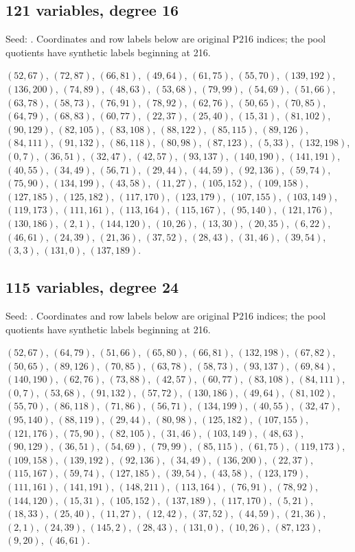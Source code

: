 \subsection*{121 variables, degree 16}
Seed: . Coordinates and row labels below are original P216 indices; the pool quotients have synthetic labels beginning at 216.
{\small\raggedright
$(52,67)$, $(72,87)$, $(66,81)$, $(49,64)$, $(61,75)$, $(55,70)$, $(139,192)$, $(136,200)$, $(74,89)$, $(48,63)$, $(53,68)$, $(79,99)$, $(54,69)$, $(51,66)$, $(63,78)$, $(58,73)$, $(76,91)$, $(78,92)$, $(62,76)$, $(50,65)$, $(70,85)$, $(64,79)$, $(68,83)$, $(60,77)$, $(22,37)$, $(25,40)$, $(15,31)$, $(81,102)$, $(90,129)$, $(82,105)$, $(83,108)$, $(88,122)$, $(85,115)$, $(89,126)$, $(84,111)$, $(91,132)$, $(86,118)$, $(80,98)$, $(87,123)$, $(5,33)$, $(132,198)$, $(0,7)$, $(36,51)$, $(32,47)$, $(42,57)$, $(93,137)$, $(140,190)$, $(141,191)$, $(40,55)$, $(34,49)$, $(56,71)$, $(29,44)$, $(44,59)$, $(92,136)$, $(59,74)$, $(75,90)$, $(134,199)$, $(43,58)$, $(11,27)$, $(105,152)$, $(109,158)$, $(127,185)$, $(125,182)$, $(117,170)$, $(123,179)$, $(107,155)$, $(103,149)$, $(119,173)$, $(111,161)$, $(113,164)$, $(115,167)$, $(95,140)$, $(121,176)$, $(130,186)$, $(2,1)$, $(144,120)$, $(10,26)$, $(13,30)$, $(20,35)$, $(6,22)$, $(46,61)$, $(24,39)$, $(21,36)$, $(37,52)$, $(28,43)$, $(31,46)$, $(39,54)$, $(3,3)$, $(131,0)$, $(137,189)$.\par}

\subsection*{115 variables, degree 24}
Seed: . Coordinates and row labels below are original P216 indices; the pool quotients have synthetic labels beginning at 216.
{\small\raggedright
$(52,67)$, $(64,79)$, $(51,66)$, $(65,80)$, $(66,81)$, $(132,198)$, $(67,82)$, $(50,65)$, $(89,126)$, $(70,85)$, $(63,78)$, $(58,73)$, $(93,137)$, $(69,84)$, $(140,190)$, $(62,76)$, $(73,88)$, $(42,57)$, $(60,77)$, $(83,108)$, $(84,111)$, $(0,7)$, $(53,68)$, $(91,132)$, $(57,72)$, $(130,186)$, $(49,64)$, $(81,102)$, $(55,70)$, $(86,118)$, $(71,86)$, $(56,71)$, $(134,199)$, $(40,55)$, $(32,47)$, $(95,140)$, $(88,119)$, $(29,44)$, $(80,98)$, $(125,182)$, $(107,155)$, $(121,176)$, $(75,90)$, $(82,105)$, $(31,46)$, $(103,149)$, $(48,63)$, $(90,129)$, $(36,51)$, $(54,69)$, $(79,99)$, $(85,115)$, $(61,75)$, $(119,173)$, $(109,158)$, $(139,192)$, $(92,136)$, $(34,49)$, $(136,200)$, $(22,37)$, $(115,167)$, $(59,74)$, $(127,185)$, $(39,54)$, $(43,58)$, $(123,179)$, $(111,161)$, $(141,191)$, $(148,211)$, $(113,164)$, $(76,91)$, $(78,92)$, $(144,120)$, $(15,31)$, $(105,152)$, $(137,189)$, $(117,170)$, $(5,21)$, $(18,33)$, $(25,40)$, $(11,27)$, $(12,42)$, $(37,52)$, $(44,59)$, $(21,36)$, $(2,1)$, $(24,39)$, $(145,2)$, $(28,43)$, $(131,0)$, $(10,26)$, $(87,123)$, $(9,20)$, $(46,61)$.\par}

